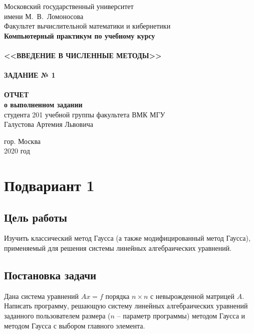 \documentclass[a4paper,12pt,titlepage,finall]{article}
\begin{document}
\begin{titlepage}
    \begin{center}
	{\small \sc Московский государственный университет \\имени М.~В.~Ломоносова\\
	Факультет вычислительной математики и кибернетики\\}
	\hrulefill
	\vfill
	{\large \bf Компьютерный практикум по учебному курсу}\\
	~\\
	{\Large \bf <<ВВЕДЕНИЕ В ЧИСЛЕННЫЕ МЕТОДЫ>>}\\ 
	~\\
	{\Large \bf ЗАДАНИЕ № 1}\\
	~\\
	{\large \bf ОТЧЕТ}\\
	{\bf о выполненном задании}\\
	{студента 201 учебной группы факультета ВМК МГУ}\\
	{Галустова Артемия Львовича}
    \end{center}
    
    \begin{center}
	\vfill
	{\small гор. Москва\\2020 год}
    \end{center}
\end{titlepage}

\tableofcontents
\newpage

\section{Подвариант 1}
\subsection{Цель работы}

Изучить классический метод Гаусса (а также модифицированный метод Гаусса),
применяемый для решения системы линейных алгебраических уравнений.

\subsection{Постановка задачи}

Дана система уравнений $Ax=f$ порядка $n \times n$ с невырожденной матрицей $A$. Написать
программу, решающую систему линейных алгебраических уравнений заданного
пользователем размера ($n$ – параметр программы) методом Гаусса и методом Гаусса с
выбором главного элемента.
\end{document}
